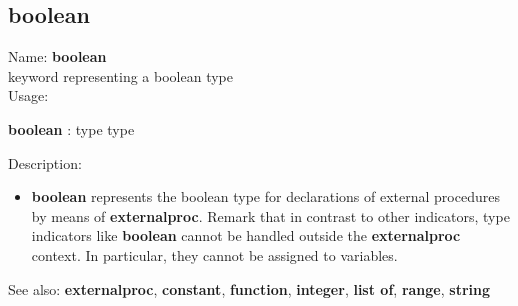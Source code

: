 \subsection{ boolean }
\noindent Name: \textbf{boolean}\\
keyword representing a \textsf{boolean} type \\

\noindent Usage: 
\begin{center}
\textbf{boolean} : \textsf{type type}\\
\end{center}
\noindent Description: \begin{itemize}

\item \textbf{boolean} represents the \textsf{boolean} type for declarations
   of external procedures by means of \textbf{externalproc}.
   Remark that in contrast to other indicators, type indicators like
   \textbf{boolean} cannot be handled outside the \textbf{externalproc} context.  In
   particular, they cannot be assigned to variables.
\end{itemize}
See also: \textbf{externalproc}, \textbf{constant}, \textbf{function}, \textbf{integer}, \textbf{list of}, \textbf{range}, \textbf{string}
